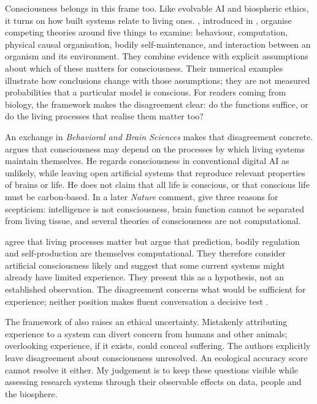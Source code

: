 Consciousness belongs in this frame too. Like evolvable AI and biospheric
ethics, it turns on how built systems relate to living ones.
\textcite{chandaria2026consciousness}, introduced in ,
organise competing theories around five things to examine:
behaviour, computation, physical causal organisation, bodily self-maintenance,
and interaction between an organism and its environment. They combine evidence
with explicit assumptions about which of these matters for consciousness.
Their numerical examples illustrate how conclusions change with those
assumptions; they are not measured probabilities that a particular model is
conscious. For readers coming from biology, the framework makes the disagreement
clear: do the functions suffice, or do the living processes that realise them
matter too?

An exchange in \emph{Behavioral and Brain Sciences} makes that disagreement
concrete. \textcite{seth2026naturalism} argues that consciousness may depend on
the processes by which living systems maintain themselves. He regards
consciousness in conventional digital AI as unlikely, while leaving open
artificial systems that reproduce relevant properties of brains or life.
He does not claim that all life is conscious, or that conscious life must be
carbon-based. In a later \emph{Nature} comment, \textcite{seth2026threereasons}
give three reasons for scepticism: intelligence is not consciousness, brain
function cannot be separated from living tissue, and several theories of
consciousness are not computational.

\textcite{richards2026computational} agree that living processes matter but
argue that prediction, bodily regulation and self-production are themselves
computational. They therefore consider artificial consciousness likely and
suggest that some current systems might already have limited experience.
They present this as a hypothesis, not an established observation.
The disagreement concerns what would be sufficient for experience; neither
position makes fluent conversation a decisive test
\parencite{seth2026naturalism,richards2026computational}.

The framework of \textcite{chandaria2026consciousness} also raises an
ethical uncertainty. Mistakenly attributing experience to a system can
divert concern from humans and other animals; overlooking experience, if it
exists, could conceal suffering. The authors explicitly leave disagreement
about consciousness unresolved. An ecological accuracy score cannot resolve it
either. My judgement is to keep these questions visible while assessing
research systems through their observable effects on data, people and the
biosphere.
